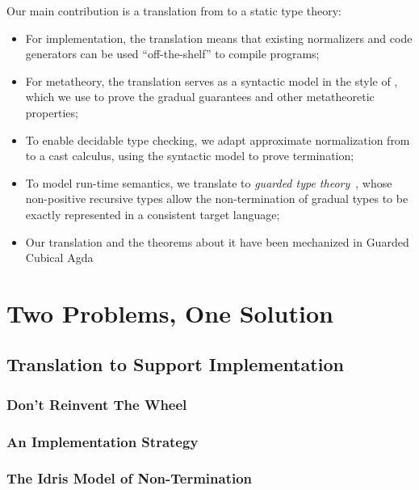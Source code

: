 Our main contribution is a translation from \lang to a static type theory:
\begin{itemize}
          \item For implementation, the translation means that existing normalizers
                and code generators can be used ``off-the-shelf'' to compile \lang programs;
  \item For metatheory, the translation serves as a syntactic model in the style of \citet{10.1145/3018610.3018620}, which we use to prove the gradual guarantees
        and other metatheoretic properties;
  \item To enable decidable type checking, we adapt approximate normalization
        from \citet{Eremondi:2019:ANG:3352468.3341692} to a cast calculus, using the syntactic
        model to prove termination;
  \item To model run-time semantics, we translate to \textit{guarded type theory}~\citep{TODO},
        whose non-positive recursive types allow the non-termination of gradual types to be
        exactly represented in a consistent target language;
  \item  Our translation and the theorems about it have been mechanized in Guarded Cubical Agda~\citep{TODO}
\end{itemize}

\section{Two Problems, One Solution}


\subsection{Translation to Support Implementation}

\subsubsection{Don't Reinvent The Wheel}

\subsubsection{An Implementation Strategy}

\subsubsection{The Idris Model of Non-Termination}

